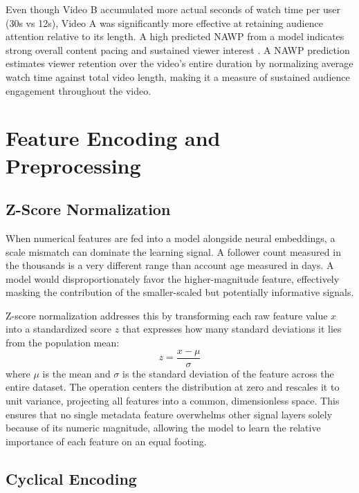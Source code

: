 Even though Video B accumulated more actual seconds of watch time per user (30s vs 12s), Video A was significantly more effective at retaining audience attention relative to its length. A high predicted NAWP from a model indicates strong overall content pacing and sustained viewer interest \cite{manic2024short}. A NAWP prediction estimates viewer retention over the video's entire duration by normalizing average watch time against total video length, making it a measure of sustained audience engagement throughout the video.

\section{Feature Encoding and Preprocessing}

\subsection{Z-Score Normalization}


When numerical features are fed into a model alongside neural embeddings, a scale mismatch can dominate the learning signal. A follower count measured in the thousands is a very different range than account age measured in days. A model would disproportionately favor the higher-magnitude feature, effectively masking the contribution of the smaller-scaled but potentially informative signals.

Z-score normalization addresses this by transforming each raw feature value $x$ into a standardized score $z$ that expresses how many standard deviations it lies from the population mean:
$$z = \frac{x - \mu}{\sigma}$$
where $\mu$ is the mean and $\sigma$ is the standard deviation of the feature across the entire dataset. The operation centers the distribution at zero and rescales it to unit variance, projecting all features into a common, dimensionless space. This ensures that no single metadata feature overwhelms other signal layers solely because of its numeric magnitude, allowing the model to learn the relative importance of each feature on an equal footing.

\subsection{Cyclical Encoding}

